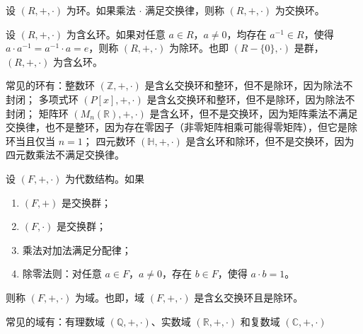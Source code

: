 \vspace{1em}

\begin{definition}
    设 $ (R,+,\cdot) $ 为环。如果乘法 $\cdot$ 满足交换律，则称 $ (R,+,\cdot) $ 为交换环。
\end{definition}

\vspace{1em}

\begin{definition}
    设 $ (R,+,\cdot) $ 为含幺环。如果对任意 $ a\in R $，$ a\neq 0 $，均存在 $ a^{-1}\in R $，使得 $ a\cdot a^{-1} = a^{-1}\cdot a = e $，则称 $ (R,+,\cdot) $ 为除环。也即  $(R-\{0\},\cdot)$ 是群，$ (R,+,\cdot) $ 为含幺环。
\end{definition}

\vspace{1em}

\begin{example}
    常见的环有：整数环 $ (\mathbb{Z},+,\cdot) $ 是含幺交换环和整环，但不是除环，因为除法不封闭；
    多项式环 $ (P[x],+,\cdot) $ 是含幺交换环和整环，但不是除环，因为除法不封闭；
    矩阵环 $ (M_n(\mathbb{R}),+,\cdot) $ 是含幺环，但不是交换环，因为矩阵乘法不满足交换律，也不是整环，因为存在零因子（非零矩阵相乘可能得零矩阵），但它是除环当且仅当 $ n=1 $；
    四元数环 $ (\mathbb{H},+,\cdot) $ 是含幺环和除环，但不是交换环，因为四元数乘法不满足交换律。
\end{example}

\vspace{1em}

\begin{definition}[域 Field]
    设 $ (F,+,\cdot) $ 为代数结构。如果
    \begin{enumerate}
        \item $ (F,+) $ 是交换群；
        \item $ (F,\cdot) $ 是交换群；
        \item 乘法对加法满足分配律；
        \item 除零法则：对任意 $ a\in F $，$ a\neq 0 $，存在 $ b\in F $，使得 $ a\cdot b = 1 $。
    \end{enumerate}
    则称 $ (F,+,\cdot) $ 为域。也即，域 $ (F,+,\cdot) $ 是含幺交换环且是除环。
\end{definition}

\vspace{1em}

\begin{example}
    常见的域有：有理数域 $ (\mathbb{Q},+,\cdot) $、实数域 $ (\mathbb{R},+,\cdot) $ 和复数域 $ (\mathbb{C},+,\cdot) $
\end{example}

